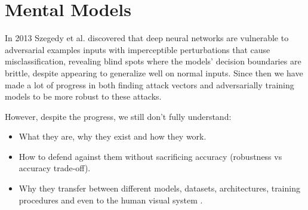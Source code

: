 \documentclass[a4paper, oneside]{discothesis}
\begin{document}



\section{Mental Models}






In 2013 Szegedy et al. \cite{cubuk2017intriguing} discovered that deep neural networks are vulnerable to adversarial examples \textendash{} inputs with imperceptible perturbations that cause misclassification, revealing blind spots where the models' decision boundaries are brittle, despite appearing to generalize well on normal inputs. Since then we have made a lot of progress in both finding attack vectors \cite{goodfellow2014explaining} \cite{madry2017towards} \cite{papernot2016limitations} and adversarially training models to be more robust \cite{shafahi2019adversarial} \cite{madry2017towards} \cite{papernot2016distillation} to these attacks.

However, despite the progress, we still don't fully understand:

\begin{itemize}
    \item What they are, why they exist and how they work.
    \item How to defend against them without sacrificing accuracy (robustness vs accuracy trade-off).
    \item Why they transfer between different models, datasets, architectures, training procedures and even to the human visual system \cite{elsayed2018adversarial}.
\end{itemize}
\end{document}
